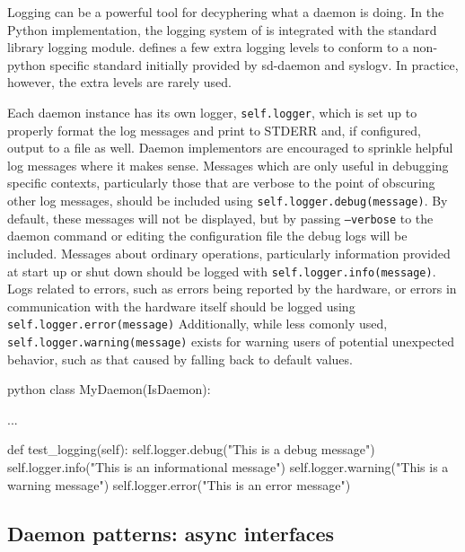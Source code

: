 Logging can be a powerful tool for decyphering what a daemon is doing.
In the Python implementation, the logging system of \yaq{} is integrated with the standard library logging module\cite{}.
\yaq{} defines a few extra logging levels to conform to a non-python specific standard initially provided by sd-daemon\cite{} and syslogv\cite{}.
In practice, however, the extra levels are rarely used.

Each daemon instance has its own logger, \texttt{self.logger}, which is set up to properly format the log messages and print to STDERR and, if configured, output to a file as well.
Daemon implementors are encouraged to sprinkle helpful log messages where it makes sense.
Messages which are only useful in debugging specific contexts, particularly those that are verbose to the point of obscuring other log messages, should be included using \texttt{self.logger.debug(message)}.
By default, these messages will not be displayed, but by passing \texttt{--verbose} to the daemon command or editing the configuration file the debug logs will be included.
Messages about ordinary operations, particularly information provided at start up or shut down should be logged with \texttt{self.logger.info(message)}.
Logs related to errors, such as errors being reported by the hardware, or errors in communication with the hardware itself should be logged using \texttt{self.logger.error(message)}
Additionally, while less comonly used, \texttt{self.logger.warning(message)} exists for warning users of potential unexpected behavior, such as that caused by falling back to default values.

\begin{codefragment}{python}
class MyDaemon(IsDaemon):

    ...

    def test_logging(self):
        self.logger.debug("This is a debug message")
        self.logger.info("This is an informational message")
        self.logger.warning("This is a warning message")
        self.logger.error("This is an error message")
\end{codefragment}



\subsection{Daemon patterns: async interfaces}

